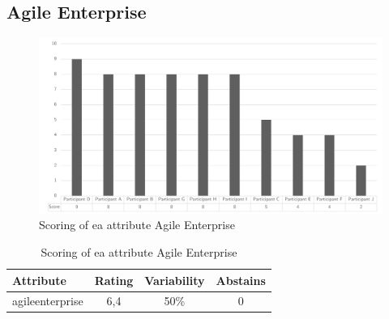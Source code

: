 \subsection{Agile Enterprise}
\begin{figure}[H]
	\centering
	\includegraphics[width=0.9\linewidth]{images/scoreeaagileenterprise}
	\caption[Scoring of \gls{ea} attribute Agile Enterprise]{Scoring of \gls{ea} attribute Agile Enterprise}
	\label{fig:appscoringeaagileneterprise}
\end{figure}
\begin{table}[H]
	\centering
	\begin{tabular}{p{}ccc}
		\toprule
		\textbf{Attribute} & \textbf{Rating} & \textbf{Variability} & \textbf{Abstains} \\
		\midrule
		\Gls{agileenterprise} & 6,4 & 50\% & 0 \\%
		\bottomrule
	\end{tabular}%
	\caption[Scoring of \gls{ea} attribute Agile Enterprise]{Scoring of \gls{ea} attribute Agile Enterprise}
	\label{tab:appscoringeaagileenterprise}%
\end{table}%
\newpage
